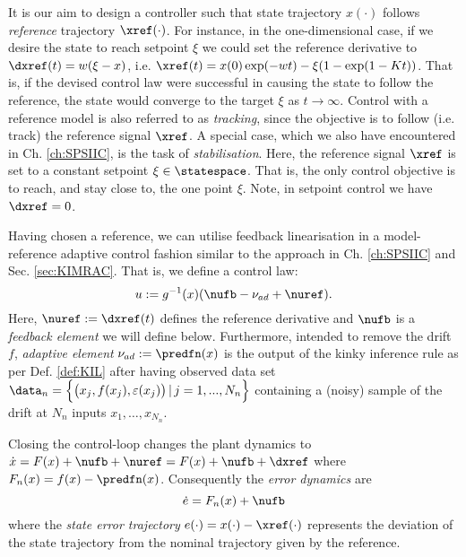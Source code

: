 It is our aim to design a controller such that state trajectory $x(\cdot)$ follows \textit{reference} trajectory $\xref(\cdot)$. 
For instance, in the one-dimensional case, if we desire the state to reach setpoint $\xi$ we could set the reference derivative to $\dxref(t) = w (\xi - x )$, i.e. $\xref(t) = x(0) \exp( - w t ) - \xi (1- \exp(1- Kt) )$. That is, if the devised control law were successful in causing the state to follow the reference, the state  would converge to the target $\xi$ as $t \to \infty$. Control with a reference model is also referred to as \textit{tracking}, since the objective is to follow (i.e. track) the reference signal $\xref$. A special case, which we also have encountered in Ch. \ref{ch:SPSIIC}, is the task of \textit{stabilisation}. Here, the reference signal $\xref$ is set to a constant setpoint $\xi \in \statespace$. That is, the only control objective is to reach, and stay close to, the one point $\xi$. Note, in setpoint control we have $\dxref =0$.

Having chosen a reference, we can utilise feedback linearisation in a model-reference adaptive control fashion \cite{Narendra1989} similar to the approach in Ch. \ref{ch:SPSIIC} and Sec. \ref{sec:KIMRAC}. That is, we define a control law:
\begin{equation}
	u:= g^{-1}(x) ( \nufb - \nu_{ad} + \nuref).
\end{equation}
Here, $\nuref := \dxref(t)$ defines the reference derivative and $\nufb$ is a \textit{feedback element} we will define below. Furthermore, intended to remove the drift $f$,
\textit{adaptive element} $\nu_{ad} := \predfn(x)$ is the output of the kinky inference rule as per Def. \ref{def:KIL} after having observed data set $\data_n=\Bigl\{\bigl(x_j, f(x_j), \varepsilon(x_j) \bigr) \,|\, j=1,...,N_n\Bigr\}$ containing a (noisy) sample of the drift at $N_n$ inputs $x_1,\ldots,x_{N_n}$. 

Closing the control-loop changes the plant dynamics to
$\dot x = F(x) +\nufb + \nuref = F(x) +\nufb + \dxref$
where $F_n(x) = f(x) - \predfn(x)$. 
Consequently the \textit{error dynamics} are
\begin{equation}
	\dot e = F_n(x) +\nufb
\end{equation}
where the \textit{state error trajectory} $e (\cdot) = x(\cdot)- \xref(\cdot)$ represents the deviation of the state trajectory from the nominal trajectory given by the reference.

